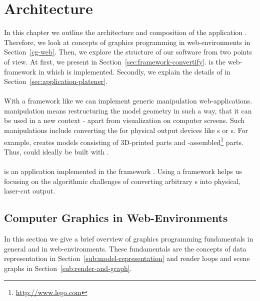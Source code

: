 \documentclass[../ClassicThesis.tex]{subfiles}
\begin{document}
\newcommand\myNotes[1]{\textcolor{red}{#1}}

\chapter{Architecture}
\label{ch:architecture}

In this chapter we outline the architecture and composition of the
application {\platener}. Therefore, we look at concepts of graphics
programming in web-environments in Section~\ref{cg-web}. Then, we
explore the structure of our software from two points of view. At
first, we present {\convertify} in
Section~\ref{sec:framework-convertify}. {\convertify} is the
web-framework in which {\platener} is implemented. Secondly, we
explain the details of {\platener} in
Section~\ref{sec:application-platener}.\\
\\
With a framework like {\convertify} we can implement generic
{\threedmodel} manipulation web-applications. {\threedmodel}
manipulation means restructuring the model geometry in such a way,
that it can be used in a new context - apart from visualization on
computer screens. Such manipulations include converting the
{\threedmodel} for physical output devices like {\threedprinter}s or
{\lasercutter}s. For example, {\brickify} creates models consisting of
3D-printed parts and
{\lego}-assembled\footnote{\url{http://www.lego.com}} parts. Thus,
{\brickify} could ideally be built with {\convertify}.\\
\\
{\platener} is an application implemented in the framework {\convertify}.
Using a framework helps us focusing on the algorithmic challenges of
converting arbitrary {\threedmodel}s into physical, laser-cut output.

\section{Computer Graphics in Web-Environments}
\label{sec:cg-web}

In this section we give a brief overview of graphics programming
fundamentals in general and in web-environments. These fundamentals
are the concepts of {\threedmodel} data representation in
Section~\ref{sub:model-representation} and render loops and scene
graphs in Section~\ref{sub:render-and-graph}.
\end{document}
